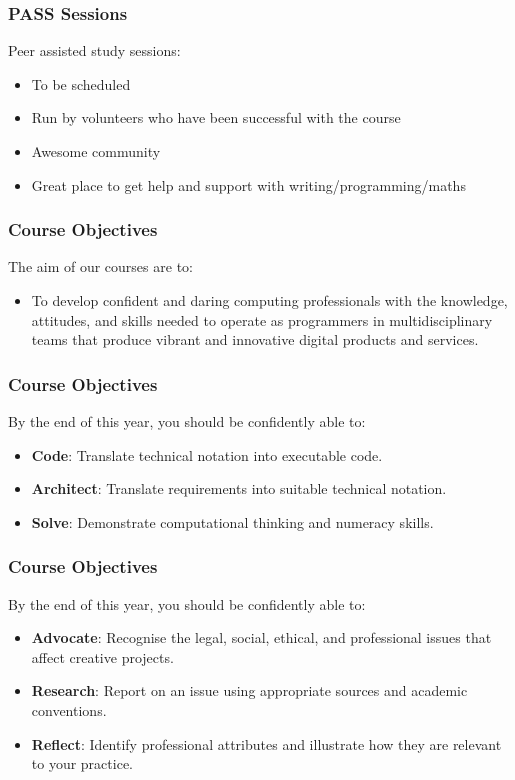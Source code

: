 \begin{frame}
	\frametitle{PASS Sessions}
	
	Peer assisted study sessions:
	
	\begin{itemize}
		\item To be scheduled
		\item Run by volunteers who have been successful with the course
		\item Awesome community
		\item Great place to get help and support with writing/programming/maths
	\end{itemize}
\end{frame}

\begin{frame}
	\frametitle{Course Objectives}
	
	The aim of our courses are to:
	
	\vspace{2em}
	
	\begin{itemize}
		\item To develop confident and daring computing professionals with the knowledge, attitudes, and skills needed to operate as programmers in multidisciplinary teams that produce vibrant and innovative digital products and services.
	\end{itemize}
\end{frame}

\begin{frame}
	\frametitle{Course Objectives}
	
	By the end of this year, you should be confidently able to: \pause
	
	\begin{itemize}
		\item \textbf{Code}: Translate technical notation into executable code. \pause
		\item \textbf{Architect}: Translate requirements into suitable technical notation. \pause
		\item \textbf{Solve}: Demonstrate computational thinking and numeracy skills.
	\end{itemize}
\end{frame}

\begin{frame}
	\frametitle{Course Objectives}
	
	By the end of this year, you should be confidently able to: \pause
	
	\begin{itemize}
		\item \textbf{Advocate}: Recognise the legal, social, ethical, and professional issues that affect creative projects. \pause
		\item \textbf{Research}: Report on an issue using appropriate sources and academic conventions.\pause
		\item \textbf{Reflect}: Identify professional attributes and illustrate how they are relevant to your practice.
	\end{itemize}
\end{frame}

